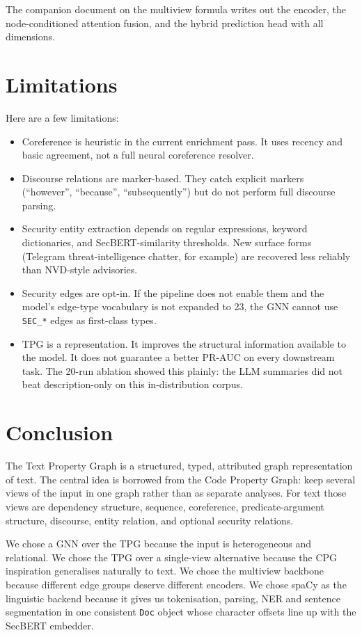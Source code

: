 \documentclass[11pt]{article}
\begin{document}
The companion document on the multiview formula writes out the
encoder, the node-conditioned attention fusion, and the hybrid
prediction head with all dimensions.

\section{Limitations}

Here are a few limitations:

\begin{itemize}
    \item Coreference is heuristic in the current enrichment pass. It
    uses recency and basic agreement, not a full neural coreference
    resolver.
    \item Discourse relations are marker-based. They catch explicit
    markers (``however'', ``because'', ``subsequently'') but do not
    perform full discourse parsing.
    \item Security entity extraction depends on regular expressions,
    keyword dictionaries, and SecBERT-similarity thresholds. New
    surface forms (Telegram threat-intelligence chatter, for example)
    are recovered less reliably than NVD-style advisories.
    \item Security edges are opt-in. If the pipeline does not enable
    them and the model's edge-type vocabulary is not expanded to 23,
    the GNN cannot use \texttt{SEC\_*} edges as first-class types.
    \item TPG is a representation. It improves the structural
    information available to the model. It does not guarantee a better
    PR-AUC on every downstream task. The 20-run ablation showed this
    plainly: the LLM summaries did not beat description-only on this
    in-distribution corpus.
\end{itemize}

\section{Conclusion}

The Text Property Graph is a structured, typed, attributed graph
representation of text. The central idea is borrowed from the Code
Property Graph: keep several views of the input in one graph rather
than as separate analyses. For text those views are dependency
structure, sequence, coreference, predicate-argument structure,
discourse, entity relation, and optional security relations.

We chose a GNN over the TPG because the input is heterogeneous and
relational. We chose the TPG over a single-view alternative because
the CPG inspiration generalises naturally to text. We chose the
multiview backbone because different edge groups deserve different
encoders. We chose spaCy as the linguistic backend because it gives
us tokenisation, parsing, NER and sentence segmentation in one
consistent \texttt{Doc} object whose character offsets line up with
the SecBERT embedder.
\end{document}
